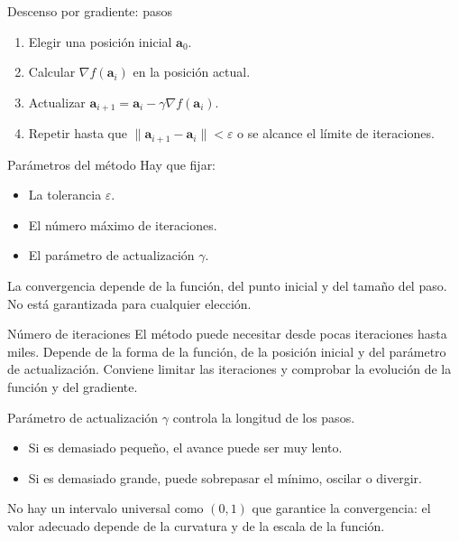 \documentclass[original_version/main.tex]{subfiles}
\begin{document}
\begin{frame}[t]{Descenso por gradiente: pasos}
\begin{enumerate}
\item Elegir una posición inicial $\boldsymbol{a}_0$.
\item Calcular $\nabla f(\boldsymbol{a}_i)$ en la posición actual.
\item Actualizar $\boldsymbol{a}_{i+1}=\boldsymbol{a}_i-\gamma\nabla f(\boldsymbol{a}_i)$.
\item Repetir hasta que $\|\boldsymbol{a}_{i+1}-\boldsymbol{a}_i\|<\varepsilon$ o se alcance el límite de iteraciones.
\end{enumerate}
\end{frame}
\begin{frame}[t]{Parámetros del método}
Hay que fijar:
\begin{itemize}
\item La tolerancia $\varepsilon$.
\item El número máximo de iteraciones.
\item El parámetro de actualización $\gamma$.
\end{itemize}
\bigskip
La convergencia depende de la función, del punto inicial y del tamaño del paso. No está garantizada para cualquier elección.
\end{frame}
\begin{frame}[t]{Número de iteraciones}
El método puede necesitar desde pocas iteraciones hasta miles.
\bigskip
Depende de la forma de la función, de la posición inicial y del parámetro de actualización.
\bigskip
Conviene limitar las iteraciones y comprobar la evolución de la función y del gradiente.
\end{frame}
\begin{frame}[t]{Parámetro de actualización}
$\gamma$ controla la longitud de los pasos.
\begin{itemize}
\item Si es demasiado pequeño, el avance puede ser muy lento.
\item Si es demasiado grande, puede sobrepasar el mínimo, oscilar o divergir.
\end{itemize}
\bigskip
No hay un intervalo universal como $(0,1)$ que garantice la convergencia: el valor adecuado depende de la curvatura y de la escala de la función.
\end{frame}
\end{document}
